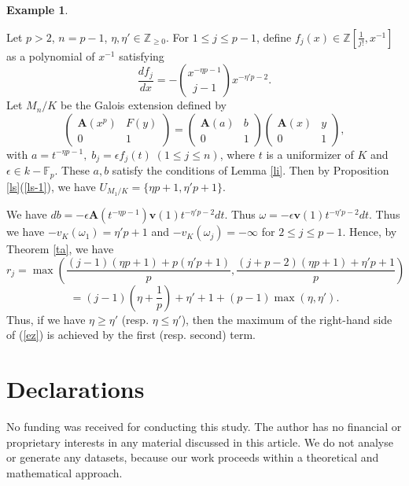 \documentclass[sn-mathphys-num]{sn-jnl}
\numberwithin{equation}{section}
\theoremstyle{plain}
\theoremstyle{definition}
\newtheorem{exam}[theo]{Example}
\begin{document}
\begin{exam}
\begin{enumerate}
  Let $p>2$, $n=p-1$, $\eta,\eta'\in\mathbb{Z}_{\geq 0}$. For $1\leq j\leq p-1$, define $f_j(x)\in\mathbb{Z}\left[\frac{1}{j!},x^{-1}\right]$ as a polynomial of $x^{-1}$ satisfying
  \begin{equation}
  \frac{df_j}{dx}=-\binom{x^{-\eta p-1}}{j-1}x^{-\eta'p-2}.
  \end{equation}
  Let $M_n/K$ be the Galois extension defined by
  \begin{equation}
\begin{pmatrix}
  \mathbf{A}(x^p)&F(y)\\
  0&1
\end{pmatrix}
=
\begin{pmatrix}
  \mathbf{A}(a)&b\\
  0&1
\end{pmatrix}
\begin{pmatrix}
  \mathbf{A}(x)&y\\
  0&1
\end{pmatrix},
\end{equation}
with $a= t^{-\eta p-1},\;b_j=\epsilon f_j(t)\;(1\leq j \leq n)$, where $t$ is a uniformizer of $K$ and $\epsilon\in k-\mathbb{F}_p$. These $a,b$ satisfy the conditions of Lemma \ref{li}. Then by Proposition \ref{ls}(\ref{ls-1}), we have $U_{M_1/K}=\{\eta p+1,\eta'p+1\}$.

We have $db=-\epsilon\mathbf{A}(t^{-\eta p-1})\mathbf{v}(1)t^{-\eta'p-2}dt$. Thus $\omega=-\epsilon\mathbf{v}(1)t^{-\eta'p-2}dt$. 
Thus we have 
$-v_K(\omega_1)=\eta'p+1$ and $-v_K(\omega_j)=-\infty$ for $2\leq j\leq p-1$.
Hence, by Theorem \ref{ta}, we have
\begin{equation}
  r_j=\max\left(\frac{(j-1)(\eta p+1)+p(\eta'p+1)}{p},\frac{(j+p-2)(\eta p+1)+\eta'p+1}{p}\right)
\end{equation}
\begin{equation}
  =(j-1)\left(\eta+\frac{1}{p}\right)+\eta'+1+(p-1)\max(\eta,\eta').
\end{equation}
Thus, if we have $\eta\geq\eta'$ (resp. $\eta\leq\eta'$), then the maximum of the right-hand side of (\ref{ez}) is achieved by the first (resp. second) term.
  \end{enumerate}
\end{exam}



\section*{Declarations}

No funding was received for conducting this study. The author has no financial or proprietary interests in any material discussed in this article. We do not analyse or generate any datasets, because our work proceeds within a theoretical and mathematical approach.


\end{document}

